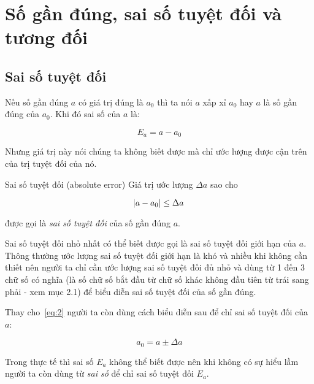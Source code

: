 \documentclass[../../Lectures.tex]{subfiles}
\begin{document}
\section{Số gần đúng, sai số tuyệt đối và tương đối}

\subsection{Sai số tuyệt đối}

Nếu số gần đúng \(a\) có giá trị đúng là \(a_0\) thì ta nói \(a\) xấp xỉ \(a_0\)
hay \(a\) là số gần đúng của \(a_0\). Khi đó sai số của \(a\) là:

\begin{equation} \label{eq:1}
    E_a = a - a_0
\end{equation}

Nhưng giá trị này nói chúng ta không biết được mà chỉ ước lượng được cận trên
của trị tuyệt đối của nó.

\begin{cdefinition}{Sai số tuyệt đối (absolute error)}{}
    Giá trị ước lượng \(\Delta a\) sao cho

    \begin{equation} \label{eq:2}
        \abs{a - a_0} \leq \Delta a
    \end{equation}

    được gọi là \emph{sai số tuyệt đối} của số gần đúng \(a\).
\end{cdefinition}

Sai số tuyệt đối nhỏ nhất có thể biết được gọi là sai số tuyệt đối giới hạn của
\(a\). Thông thường ước lượng sai số tuyệt đối giới hạn là khó và nhiều khi
không cần thiết nên người ta chỉ cần ước lượng sai số tuyệt đối đủ nhỏ và dùng
từ 1 đến 3 chữ số có nghĩa (là số chữ số bắt đầu từ chữ số khác không đầu tiên
từ trái sang phải - xem mục 2.1) để biểu diễn sai số tuyệt đối của số gần đúng.

Thay cho~\ref{eq:2} người ta còn dùng cách biểu diễn sau để chỉ sai số tuyệt đối
của \(a\):

\begin{equation} \label{eq:3}
    a_0 = a \pm \Delta a
\end{equation}

Trong thực tế thì sai số \(E_a\) không thể biết được nên khi không có sự hiểu
lầm người ta còn dùng từ \emph{sai số} để chỉ sai số tuyệt đối \(E_a\).
\end{document}
